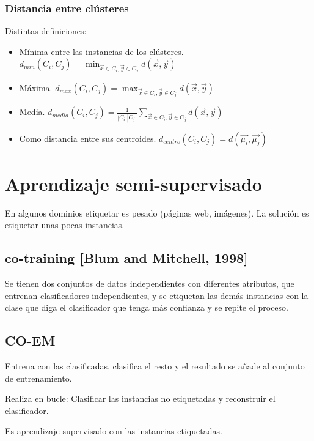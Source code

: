 \documentclass[12pt, twoside, openright]{report} %
\begin{document}
\pagebreak

\subsubsection{Distancia entre clústeres}

Distintas definiciones:
\begin{itemize}
	\item Mínima entre las instancias de los clústeres. $d_{min}(C_i, C_j) = \min_{\vec{x} \in C_i, \vec{y} \in C_j} d(\vec{x}, \vec{y})$
	\item Máxima. $d_{max}(C_i, C_j) = \max_{\vec{x} \in C_i, \vec{y} \in C_j} d(\vec{x}, \vec{y})$
	\item Media. $d_{media}(C_i, C_j) = \frac{1}{|C_i||C_j|} \sum_{\vec{x} \in C_i, \vec{y} \in C_j} d(\vec{x}, \vec{y})$
	\item Como distancia entre sus centroides. $d_{centro}(C_i, C_j) = d(\vec{\mu_i}, \vec{\mu_j})$
\end{itemize}

\section{Aprendizaje semi-supervisado}

En algunos dominios etiquetar es pesado (páginas web, imágenes). La solución es etiquetar unas pocas instancias.

\subsection{co-training [Blum and Mitchell, 1998]}

Se tienen dos conjuntos de datos independientes con diferentes atributos, que entrenan clasificadores independientes, y se etiquetan las demás instancias con la clase que diga el clasificador que tenga más confianza y se repite el proceso.

\subsection{CO-EM}

Entrena con las clasificadas, clasifica el resto y el resultado se añade al conjunto de entrenamiento.

Realiza en bucle: Clasificar las instancias no etiquetadas y reconstruir el clasificador.

Es aprendizaje supervisado con las instancias etiquetadas.
\end{document}
